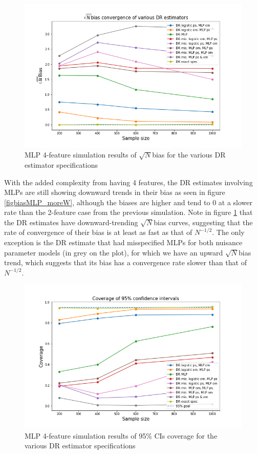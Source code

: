 \documentclass[12pt,twoside]{article}
\begin{document}
\begin{figure}[h!]
    \centering
    \includegraphics[width = 0.9\columnwidth]{figures/sqrtnMLP_moreW.png}
    \caption{MLP 4-feature simulation results of $\sqrt{N}$bias for the various DR estimator specifications}
    \label{figsqrtnMLP_moreW}
\end{figure}

With the added complexity from having 4 features, the DR estimates involving MLPs are still showing downward trends in their bias as seen in figure \ref{figbiasMLP_moreW}, although the biases are higher and tend to 0 at a slower rate than the 2-feature case from the previous simulation. Note in figure \ref{figsqrtnMLP_moreW} that the DR estimates have downward-trending $\sqrt{N}$bias curves, suggesting that the rate of convergence of their bias is at least as fast as that of $N^{-1/2}$. The only exception is the DR estimate that had misspecified MLPs for both nuisance parameter models (in grey on the plot), for which we have an upward $\sqrt{N}$bias trend, which suggests that its bias has a convergence rate slower than that of $N^{-1/2}$.

\begin{figure}[h!]
    \centering
    \includegraphics[width = 0.9\columnwidth]{figures/CIMLP_moreW.png}
    \caption{MLP 4-feature simulation results of 95\% CIs coverage for the various DR estimator specifications}
    \label{figCIMLP_moreW}
\end{figure}
\end{document}
